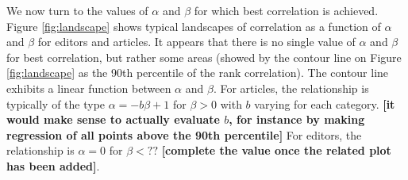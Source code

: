 We now turn to the values of $\alpha$ and $\beta$ for which best correlation is achieved.  Figure \ref{fig:landscape} shows typical landscapes of correlation as a function of $\alpha$ and $\beta$ for editors and articles. It appears that there is no single value of $\alpha$ and $\beta$ for best correlation, but rather some areas (showed by the contour line on Figure \ref{fig:landscape} as the 90th percentile of the rank correlation). The contour line exhibits a linear function between $\alpha$ and $\beta$. For articles, the relationship is typically of the type $\alpha = - b \beta + 1$ for $\beta >0$ with $b$ varying for each category. {\bf [it would make sense to actually evaluate $b$, for instance by making regression of all points above the 90th percentile]} For editors, the relationship is $\alpha = 0$ for $\beta < ??$ {\bf [complete the value once the related plot has been added]}. 



